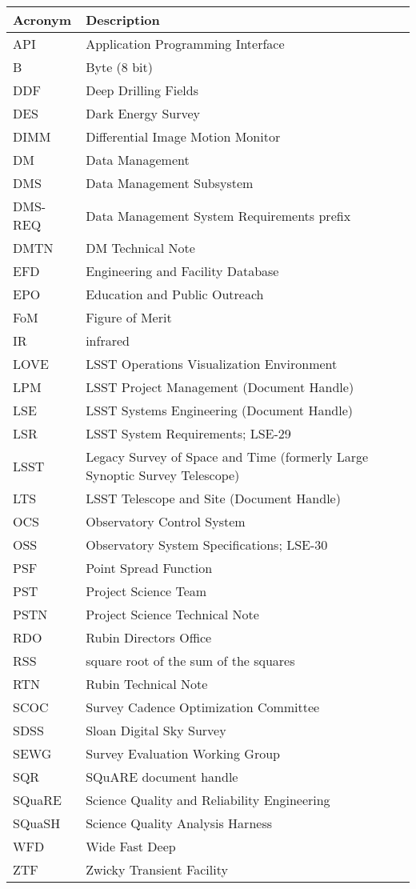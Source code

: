 \addtocounter{table}{-1}
\begin{longtable}{p{}p{}}\hline
\textbf{Acronym} & \textbf{Description}  \\\hline

API & Application Programming Interface \\\hline
B & Byte (8 bit) \\\hline
DDF & Deep Drilling Fields \\\hline
DES & Dark Energy Survey \\\hline
DIMM & Differential Image Motion Monitor \\\hline
DM & Data Management \\\hline
DMS & Data Management Subsystem \\\hline
DMS-REQ & Data Management System Requirements prefix \\\hline
DMTN & DM Technical Note \\\hline
EFD & Engineering and Facility Database \\\hline
EPO & Education and Public Outreach \\\hline
FoM & Figure of Merit \\\hline
IR & infrared \\\hline
LOVE & LSST Operations Visualization Environment \\\hline
LPM & LSST Project Management (Document Handle) \\\hline
LSE & LSST Systems Engineering (Document Handle) \\\hline
LSR & LSST System Requirements; LSE-29 \\\hline
LSST & Legacy Survey of Space and Time (formerly Large Synoptic Survey Telescope) \\\hline
LTS & LSST Telescope and Site  (Document Handle) \\\hline
OCS & Observatory Control System \\\hline
OSS & Observatory System Specifications; LSE-30 \\\hline
PSF & Point Spread Function \\\hline
PST & Project Science Team \\\hline
PSTN & Project Science Technical Note \\\hline
RDO & Rubin Directors Office \\\hline
RSS & square root of the sum of the squares \\\hline
RTN & Rubin Technical Note \\\hline
SCOC & Survey Cadence Optimization Committee \\\hline
SDSS & Sloan Digital Sky Survey \\\hline
SEWG & Survey Evaluation Working Group \\\hline
SQR & SQuARE document handle \\\hline
SQuaRE & Science Quality and Reliability Engineering \\\hline
SQuaSH & Science Quality Analysis Harness \\\hline
WFD & Wide Fast Deep \\\hline
ZTF & Zwicky Transient Facility \\\hline
\end{longtable}
